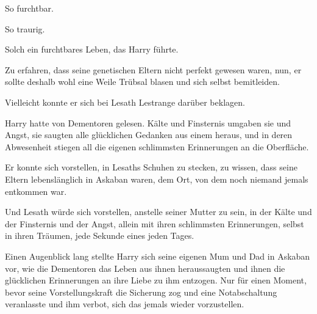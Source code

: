 So furchtbar.

So traurig.

Solch ein furchtbares Leben, das Harry führte.

Zu erfahren, dass seine genetischen Eltern nicht perfekt gewesen waren, nun, er sollte deshalb wohl eine Weile Trübsal blasen und sich selbst bemitleiden.

Vielleicht konnte er sich bei Lesath Lestrange darüber beklagen.

Harry hatte von Dementoren gelesen. Kälte und Finsternis umgaben sie und Angst, sie saugten alle glücklichen Gedanken aus einem heraus, und in deren Abwesenheit stiegen all die eigenen schlimmsten Erinnerungen an die Oberfläche.

Er konnte sich vorstellen, in Lesaths Schuhen zu stecken, zu wissen, dass seine Eltern lebenslänglich in Askaban waren, dem Ort, von dem noch niemand jemals entkommen war.

Und Lesath würde sich vorstellen, anstelle seiner Mutter zu sein, in der Kälte und der Finsternis und der Angst, allein mit ihren schlimmsten Erinnerungen, selbst in ihren Träumen, jede Sekunde eines jeden Tages.

Einen Augenblick lang stellte Harry sich seine eigenen Mum und Dad in Askaban vor, wie die Dementoren das Leben aus ihnen heraussaugten und ihnen die glücklichen Erinnerungen an ihre Liebe zu ihm entzogen. Nur für einen Moment, bevor seine Vorstellungskraft die Sicherung zog und eine Notabschaltung veranlasste und ihm verbot, sich das jemals wieder vorzustellen.

